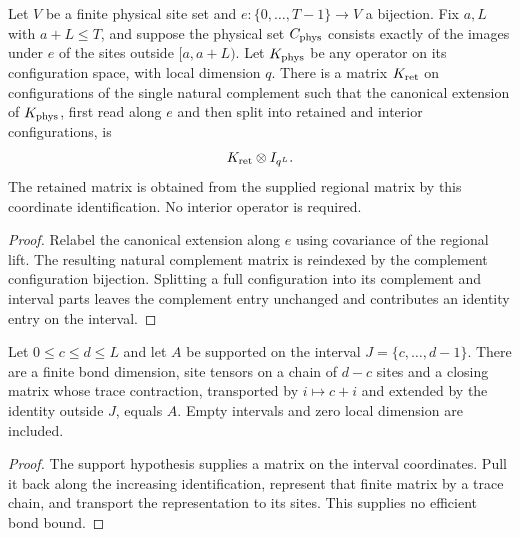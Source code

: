 \begin{lemma}
    \label{thm:physical_interval_retained_matrix}
    \leanok
    Let $V$ be a finite physical site set and $e:\{0,\ldots,T-1\}\to V$
    a bijection. Fix $a,L$ with $a+L\le T$, and suppose the physical set
    $C_{\rm phys}$ consists exactly of the images under $e$ of the sites
    outside $[a,a+L)$. Let $K_{\rm phys}$ be any operator on its
    configuration space, with local dimension $q$.
    There is a matrix $K_{\rm ret}$ on configurations of the single
    natural complement such that the canonical extension of $K_{\rm phys}$,
    first read along $e$ and then split into retained and interior
    configurations, is
    \begin{align}
        K_{\rm ret}\otimes I_{q^L}.
        \label{eq:physical_interval_retained_matrix}
    \end{align}
    The retained matrix is obtained from the supplied regional matrix
    by this coordinate identification. No interior operator is required.
\end{lemma}
\begin{proof}\leanok
    Relabel the canonical extension along $e$ using covariance of the
    regional lift. The resulting natural complement matrix is reindexed
    by the complement configuration bijection. Splitting a full
    configuration into its complement and interval parts leaves the
    complement entry unchanged and contributes an identity entry on the
    interval.
\end{proof}

\begin{lemma}
    \label{thm:supported_interval_trace_chain}
    \leanok
    Let $0\le c\le d\le L$ and let $A$ be supported on the interval
    $J=\{c,\ldots,d-1\}$. There are a finite bond dimension, site tensors
    on a chain of $d-c$ sites and a closing matrix whose trace contraction,
    transported by $i\mapsto c+i$ and extended by the identity outside $J$,
    equals $A$. Empty intervals and zero local dimension are included.
\end{lemma}
\begin{proof}
    \leanok
    The support hypothesis supplies a matrix on the interval coordinates.
    Pull it back along the increasing identification, represent that finite
    matrix by a trace chain, and transport the representation to its sites.
    This supplies no efficient bond bound.
\end{proof}

